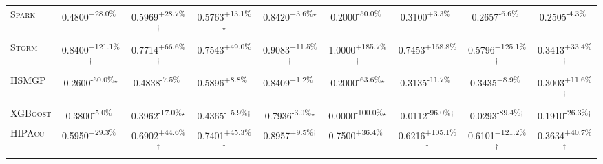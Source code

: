 \begin{table}[htbp]
\begin{tabular}{l|cccc|cccc}
\textsc{Spark} & \cellcolor{green!30}0.4800\textsuperscript{+28.0\%}$^{\,\,\,}$ & \cellcolor{green!30}0.5969\textsuperscript{+28.7\%}$^\dagger$ & \cellcolor{green!30}0.5763\textsuperscript{+13.1\%}$^\star$ & \cellcolor{green!30}0.8420\textsuperscript{+3.6\%}$^\star$ & \cellcolor{red!30}0.2000\textsuperscript{-50.0\%}$^{\,\,\,}$ & \cellcolor{green!30}0.3100\textsuperscript{+3.3\%}$^{\,\,\,}$ & \cellcolor{red!30}0.2657\textsuperscript{-6.6\%}$^{\,\,\,}$ & \cellcolor{red!30}0.2505\textsuperscript{-4.3\%}$^{\,\,\,}$ \\
\textsc{Storm} & \cellcolor{green!30}0.8400\textsuperscript{+121.1\%}$^\dagger$ & \cellcolor{green!30}0.7714\textsuperscript{+66.6\%}$^\dagger$ & \cellcolor{green!30}0.7543\textsuperscript{+49.0\%}$^\dagger$ & \cellcolor{green!30}0.9083\textsuperscript{+11.5\%}$^\dagger$ & \cellcolor{green!30}1.0000\textsuperscript{+185.7\%}$^\dagger$ & \cellcolor{green!30}0.7453\textsuperscript{+168.8\%}$^\dagger$ & \cellcolor{green!30}0.5796\textsuperscript{+125.1\%}$^\dagger$ & \cellcolor{green!30}0.3413\textsuperscript{+33.4\%}$^\dagger$ \\
\textsc{HSMGP} & \cellcolor{red!30}0.2600\textsuperscript{-50.0\%}$^\star$ & \cellcolor{red!30}0.4838\textsuperscript{-7.5\%}$^{\,\,\,}$ & \cellcolor{green!30}0.5896\textsuperscript{+8.8\%}$^{\,\,\,}$ & \cellcolor{green!30}0.8409\textsuperscript{+1.2\%}$^{\,\,\,}$ & \cellcolor{red!30}0.2000\textsuperscript{-63.6\%}$^\star$ & \cellcolor{red!30}0.3135\textsuperscript{-11.7\%}$^{\,\,\,}$ & \cellcolor{green!30}0.3435\textsuperscript{+8.9\%}$^{\,\,\,}$ & \cellcolor{green!30}0.3003\textsuperscript{+11.6\%}$^\dagger$ \\
\textsc{XGBoost} & \cellcolor{red!30}0.3800\textsuperscript{-5.0\%}$^{\,\,\,}$ & \cellcolor{red!30}0.3962\textsuperscript{-17.0\%}$^\star$ & \cellcolor{red!30}0.4365\textsuperscript{-15.9\%}$^\dagger$ & \cellcolor{red!30}0.7936\textsuperscript{-3.0\%}$^\star$ & \cellcolor{red!30}0.0000\textsuperscript{-100.0\%}$^\star$ & \cellcolor{red!30}0.0112\textsuperscript{-96.0\%}$^\dagger$ & \cellcolor{red!30}0.0293\textsuperscript{-89.4\%}$^\dagger$ & \cellcolor{red!30}0.1910\textsuperscript{-26.3\%}$^\dagger$ \\
\textsc{HIPAcc} & \cellcolor{green!30}0.5950\textsuperscript{+29.3\%}$^{\,\,\,}$ & \cellcolor{green!30}0.6902\textsuperscript{+44.6\%}$^\dagger$ & \cellcolor{green!30}0.7401\textsuperscript{+45.3\%}$^\dagger$ & \cellcolor{green!30}0.8957\textsuperscript{+9.5\%}$^\dagger$ & \cellcolor{green!30}0.7500\textsuperscript{+36.4\%}$^{\,\,\,}$ & \cellcolor{green!30}0.6216\textsuperscript{+105.1\%}$^\dagger$ & \cellcolor{green!30}0.6101\textsuperscript{+121.2\%}$^\dagger$ & \cellcolor{green!30}0.3634\textsuperscript{+40.7\%}$^\dagger$ \\

\end{tabular}
\end{table}
